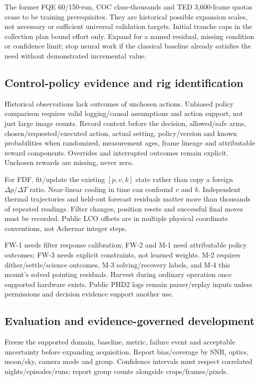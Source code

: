 \documentclass[11pt,a4paper]{article}
\begin{document}
The former FQE 60/150-run, COC class-thousands and TED 3,600-frame quotas cease
to be training prerequisites. They are historical possible expansion scales,
not necessary or sufficient universal validation targets. Initial tranche caps
in the collection plan bound effort only. Expand for a named residual, missing
condition or confidence limit; stop neural work if the classical baseline
already satisfies the need without demonstrated incremental value.

\subsection{Control-policy evidence and rig identification}
Historical observations lack outcomes of unchosen actions. Unbiased policy
comparison requires valid logging/causal assumptions and action support, not
just large image counts. Record context before the decision, allowed/safe arms,
chosen/requested/executed action, actual setting, policy/version and known
probabilities when randomized, measurement ages, frame lineage and attributable
reward components. Overrides and interrupted outcomes remain explicit.
Unchosen rewards are missing, never zero.\cite{banditoffline}

For FDF, fit/update the existing $[p,v,k]$ state rather than copy a foreign
$\Delta p/\Delta T$ ratio. Near-linear cooling in time can confound $v$ and $k$.
Independent thermal trajectories and held-out forecast residuals matter more
than thousands of repeated readings. Filter changes, position resets and
successful final moves must be recorded. Public LCO offsets are in multiple
physical coordinate conventions, not Achernar integer steps.

FW-1 needs filter response calibration; FW-2 and M-1 need attributable policy
outcomes; FW-3 needs explicit constraints, not learned weights. M-2 requires
dither/settle/science outcomes, M-3 solving/recovery labels, and M-4 this mount's
solved pointing residuals. Harvest during ordinary operation once supported
hardware exists. Public PHD2 logs remain parser/replay inputs unless permissions
and decision evidence support another use.

\subsection{Evaluation and evidence-governed development}
Freeze the supported domain, baseline, metric, failure event and acceptable
uncertainty before expanding acquisition. Report bias/coverage by SNR, optics,
moon/sky, camera mode and group. Confidence intervals must respect correlated
nights/episodes/runs; report group counts alongside crops/frames/pixels.
\end{document}
